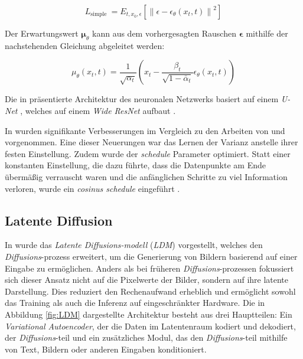 \documentclass[
  a4paper,  %
  twoside,  %
  bibliography=totoc,
  headsepline,
  cleardoublepage=empty,
  parskip=half,
  draft=false
]{scrbook}
\begin{document}
\begin{equation}
    L_{\text {simple }}=E_{t, x_0, \epsilon}\left[\left\|\epsilon-\epsilon_\theta\left(x_t, t\right)\right\|^2\right]
\end{equation}

Der Erwartungswert $\boldsymbol{\mu}_\theta$ kann aus dem vorhergesagten Rauschen $\boldsymbol{\epsilon}$ mithilfe der nachstehenden Gleichung abgeleitet werden:

\begin{equation}
    \mu_\theta\left(x_t, t\right)=\frac{1}{\sqrt{\alpha_t}}\left(x_t-\frac{\beta_t}{\sqrt{1-\bar{\alpha}_t}} \epsilon_\theta\left(x_t, t\right)\right)
\end{equation}

Die in \cite{ho_denoising_2020} präsentierte Architektur des neuronalen Netzwerks basiert auf einem \emph{U-Net} \cite{ronneberger_u-net_2015}, welches auf einem \emph{Wide ResNet} \cite{zagoruyko_wide_2017} aufbaut \cite{ho_denoising_2020}.

In \cite{nichol_improved_2021} wurden signifikante Verbesserungen im Vergleich zu den Arbeiten von \cite{sohl-dickstein_deep_2015} und \cite{ho_denoising_2020} vorgenommen. Eine dieser Neuerungen war das Lernen der Varianz anstelle ihrer festen Einstellung. Zudem wurde der \emph{schedule} Parameter optimiert. Statt einer konstanten Einstellung, die dazu führte, dass die Datenpunkte am Ende übermäßig verrauscht waren und die anfänglichen Schritte zu viel Information verloren, wurde ein \emph{cosinus schedule} eingeführt \cite{nichol_improved_2021}.

\subsection{Latente Diffusion}

In \cite{rombach_high-resolution_2022} wurde das \emph{Latente \emph{Diffusions}-modell} (\emph{LDM}) vorgestellt, welches den \emph{Diffusions}-prozess \cite{sohl-dickstein_deep_2015, ho_denoising_2020, nichol_improved_2021, dhariwal_diffusion_2021} erweitert, um die Generierung von Bildern basierend auf einer Eingabe zu ermöglichen. Anders als bei früheren \emph{Diffusions}-prozessen fokussiert sich dieser Ansatz nicht auf die Pixelwerte der Bilder, sondern auf ihre latente Darstellung. Dies reduziert den Rechenaufwand erheblich und ermöglicht sowohl das Training als auch die Inferenz auf eingeschränkter Hardware. Die in Abbildung \ref{fig:LDM} dargestellte Architektur besteht aus drei Hauptteilen: Ein \emph{Variational Autoencoder}, der die Daten im Latentenraum kodiert und dekodiert, der \emph{Diffusions}-teil und ein zusätzliches Modul, das den \emph{Diffusions}-teil mithilfe von Text, Bildern oder anderen Eingaben konditioniert.
\end{document}
